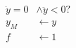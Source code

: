 \documentclass[10pt]{article}
\begin{document}
\begin{align*}\dot{y}=0 &\wedge \ddot{y}<0?\\
y_{M}&\leftarrow y\\
f &\leftarrow 1\end{align*}
\end{document}
